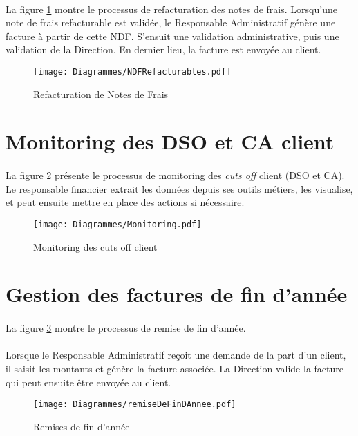 \paragraph{}La figure \ref{NDFRefacturables} montre le processus de refacturation des notes de frais. Lorsqu'une note de frais refacturable est validée, le Responsable Administratif génère une facture à partir de cette NDF. S'ensuit une validation administrative, puis une validation de la Direction. En dernier lieu, la facture est envoyée au client.


\begin{figure}
	\centering
		\texttt{[image: Diagrammes/NDFRefacturables.pdf]}
	\caption{Refacturation de Notes de Frais}
	\label{NDFRefacturables}	
\end{figure}


\section{Monitoring des DSO et CA client}

\paragraph{} La figure \ref{monitoringCO} présente le processus de monitoring des \textit{cuts off} client (DSO et CA). Le responsable financier extrait les données depuis ses outils métiers, les visualise, et peut ensuite mettre en place des actions si nécessaire.

\begin{figure}
	\centering
		\texttt{[image: Diagrammes/Monitoring.pdf]}
	\caption{Monitoring des cuts off client}
	\label{monitoringCO}	
\end{figure}


\section{Gestion des factures de fin d'année}

\paragraph{} La figure \ref{rfa} montre le processus de remise de fin d'année.
\paragraph{} Lorsque le Responsable Administratif reçoit une demande de la part d'un client, il saisit les montants et génère la facture associée. La Direction valide la facture qui peut ensuite être envoyée au client.

\begin{figure}
	\centering
		\texttt{[image: Diagrammes/remiseDeFinDAnnee.pdf]}
	\caption{Remises de fin d'année}
	\label{rfa}	
\end{figure}
